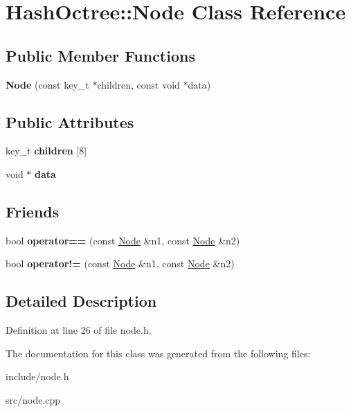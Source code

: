 \hypertarget{class_hash_octree_1_1_node}{}\section{Hash\+Octree\+::Node Class Reference}
\label{class_hash_octree_1_1_node}
\subsection*{Public Member Functions}
\begin{DoxyCompactItemize}
\item 
\mbox{\label{class_hash_octree_1_1_node_aad8b2499e8693406c6f5bbf34b582c4e}} 
{\bfseries Node} (const key\+\_\+t $\ast$children, const void $\ast$data)
\end{DoxyCompactItemize}
\subsection*{Public Attributes}
\begin{DoxyCompactItemize}
\item 
\mbox{\label{class_hash_octree_1_1_node_a5f588a6c54aa700b4e15d58fd76570a7}} 
key\+\_\+t {\bfseries children} \mbox{[}8\mbox{]}
\item 
\mbox{\label{class_hash_octree_1_1_node_ab55f1b98c6e3e1ff51324878e1aa4ff9}} 
void $\ast$ {\bfseries data}
\end{DoxyCompactItemize}
\subsection*{Friends}
\begin{DoxyCompactItemize}
\item 
\mbox{\label{class_hash_octree_1_1_node_a156456698e98563a77c4c0af13c20db1}} 
bool {\bfseries operator==} (const \mbox{\hyperlink{class_hash_octree_1_1_node}{Node}} \&n1, const \mbox{\hyperlink{class_hash_octree_1_1_node}{Node}} \&n2)
\item 
\mbox{\label{class_hash_octree_1_1_node_ab6e5d53f0f5779ea42a87e85a1f79277}} 
bool {\bfseries operator!=} (const \mbox{\hyperlink{class_hash_octree_1_1_node}{Node}} \&n1, const \mbox{\hyperlink{class_hash_octree_1_1_node}{Node}} \&n2)
\end{DoxyCompactItemize}


\subsection{Detailed Description}


Definition at line 26 of file node.\+h.



The documentation for this class was generated from the following files\+:\begin{DoxyCompactItemize}
\item 
include/node.\+h\item 
src/node.\+cpp\end{DoxyCompactItemize}

